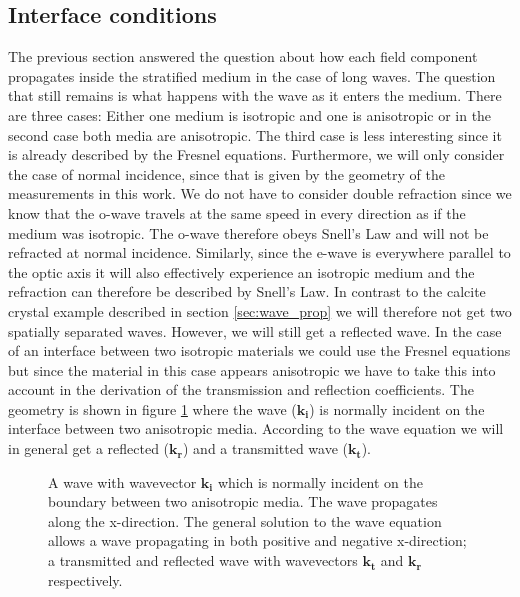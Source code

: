 \subsection{Interface conditions}
\label{sec:interface_conditions}
The previous section answered the question about how each field component propagates inside the stratified medium in the case of long waves. The question that still remains is what happens with the wave as it enters the medium. There are three cases: Either one medium is isotropic and one is anisotropic or in the second case both media are anisotropic. The third case is less interesting since it is already described by the Fresnel equations. Furthermore, we will only consider the case of normal incidence, since that is given by the geometry of the measurements in this work. We do not have to consider double refraction since we know that the o-wave travels at the same speed in every direction as if the medium was isotropic. The o-wave therefore obeys Snell's Law and will not be refracted at normal incidence. Similarly, since the e-wave is everywhere parallel to the optic axis it will also effectively experience an isotropic medium and the refraction can therefore be described by Snell's Law. In contrast to the calcite crystal example described in section \ref{sec:wave_prop} we will therefore not get two spatially separated waves. However, we will still get a reflected wave. In the case of an interface between two isotropic materials we could use the Fresnel equations but since the material in this case appears anisotropic we have to take this into account in the derivation of the transmission and reflection coefficients. The geometry is shown in figure \ref{fig:interface_derivation} where the wave ($\bm{k_i}$) is normally incident on the interface between two anisotropic media. According to the wave equation we will in general get a reflected ($\bm{k_r}$) and a transmitted wave ($\bm{k_t}$). 

\begin{figure}[h]
    \centering
    
    \caption{A wave with wavevector $\bm{k_i}$ which is normally incident on the boundary between two anisotropic media. The wave propagates along the x-direction. The general solution to the wave equation allows a wave propagating in both positive and negative x-direction; a transmitted and reflected wave with wavevectors $\bm{k_t}$ and $\bm{k_r}$ respectively.}
    \label{fig:interface_derivation}
\end{figure}

